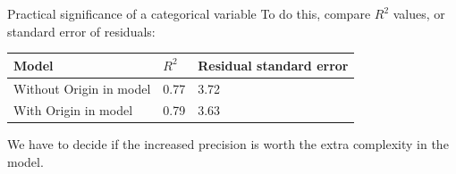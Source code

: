 \documentclass{beamer}\usepackage[]{graphicx}\usepackage[]{color}
\begin{document}
\begin{darkframes}
\begin{frame}{Practical significance of a categorical variable}
        To do this, compare $R^2$ values, or standard error of residuals:

        \bigskip

        \begin{tabular}{lll}
        \textbf{Model} & \textbf{$R^2$} & \textbf{Residual standard error} \\
        \hline
        Without Origin in model & 0.77 & 3.72 \\
        With Origin in model & 0.79 & 3.63 \\
        \hline
        \end{tabular}

        \bigskip

        We have to decide if the increased precision is worth the extra complexity in the model.
\end{frame}

  \end{darkframes}
\end{document}

